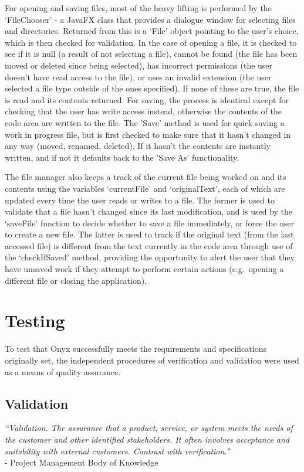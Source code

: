 \documentclass[
]{report}
\begin{document}
For opening and saving files, most of the heavy lifting is performed by
the `FileChooser' - a JavaFX class that provides a dialogue window for
selecting files and directories. Returned from this is a `File' object
pointing to the user's choice, which is then checked for validation. In
the case of opening a file, it is checked to see if it is null (a result
of not selecting a file), cannot be found (the file has been moved or
deleted since being selected), has incorrect permissions (the user
doesn't have read access to the file), or uses an invalid extension (the
user selected a file type outside of the ones specified). If none of
these are true, the file is read and its contents returned. For saving,
the process is identical except for checking that the user has write
access instead, otherwise the contents of the code area are written to
the file. The 'Save' method is used for quick saving a work in progress
file, but is first checked to make sure that it hasn't changed in any
way (moved, renamed, deleted). If it hasn't the contents are instantly
written, and if not it defaults back to the 'Save As' functionality.

The file manager also keeps a track of the current file being worked on
and its contents using the variables `currentFile' and `originalText',
each of which are updated every time the user reads or writes to a file.
The former is used to validate that a file hasn't changed since its last
modification, and is used by the `saveFile' function to decide whether
to save a file immediately, or force the user to create a new file. The
latter is used to track if the original text (from the last accessed
file) is different from the text currently in the code area through use
of the `checkIfSaved' method, providing the opportunity to alert the
user that they have unsaved work if they attempt to perform certain
actions (e.g.~opening a different file or closing the application).

\chapter{Testing}
To test that Onyx successfully meets the requirements and specifications
originally set, the independent procedures of verification and
validation were used as a means of quality assurance.

\section{Validation}
\emph{``Validation. The assurance that a product, service, or system meets the
needs of the customer and other identified stakeholders. It often
involves acceptance and suitability with external customers. Contrast
with verification.''} \\
- Project Management Body of Knowledge \cite{pmbok-book}
\end{document}
